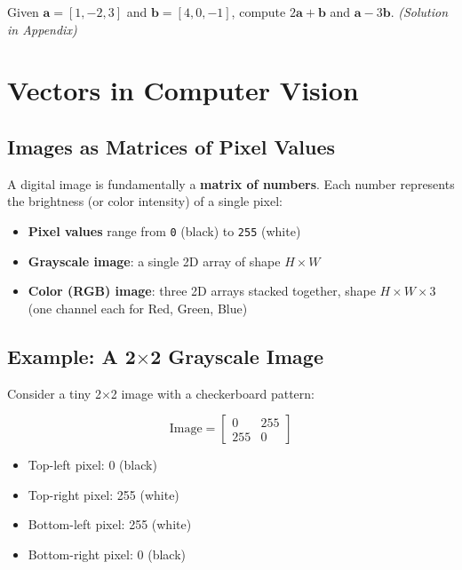 \documentclass[11pt,a4paper]{article}
\begin{document}
\begin{tcolorbox}[questionbox={Self-Check Q1}]
Given $\mathbf{a} = [1, -2, 3]$ and $\mathbf{b} = [4, 0, -1]$, compute $2\mathbf{a} + \mathbf{b}$ and $\mathbf{a} - 3\mathbf{b}$. \textit{(Solution in Appendix)}
\end{tcolorbox}

\section{Vectors in Computer Vision}

\subsection{Images as Matrices of Pixel Values}

A digital image is fundamentally a \textbf{matrix of numbers}. Each number represents the brightness (or color intensity) of a single pixel:

\begin{itemize}[leftmargin=1.5em]
    \item \textbf{Pixel values} range from \texttt{0} (black) to \texttt{255} (white)
    \item \textbf{Grayscale image}: a single 2D array of shape $H \times W$
    \item \textbf{Color (RGB) image}: three 2D arrays stacked together, shape $H \times W \times 3$ (one channel each for Red, Green, Blue)
\end{itemize}

\subsection{Example: A 2$\times$2 Grayscale Image}

Consider a tiny 2$\times$2 image with a checkerboard pattern:

\[
\text{Image} = \begin{bmatrix} 0 & 255 \\ 255 & 0 \end{bmatrix}
\]

\begin{itemize}[leftmargin=1.5em]
    \item Top-left pixel: 0 (black)
    \item Top-right pixel: 255 (white)
    \item Bottom-left pixel: 255 (white)
    \item Bottom-right pixel: 0 (black)
\end{itemize}
\end{document}
